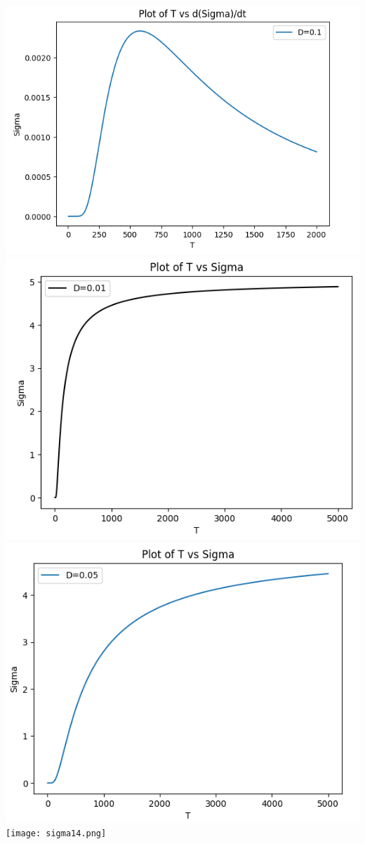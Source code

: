 \documentclass[12pt,a4paper]{article}
\begin{document}
\includegraphics[width=6.5 cm]{sigma11.png}\\
\includegraphics[width=6.5 cm]{sigma12.png}
\includegraphics[width=6.5 cm]{sigma13.png}
\texttt{[image: sigma14.png]}\\
\end{document}
